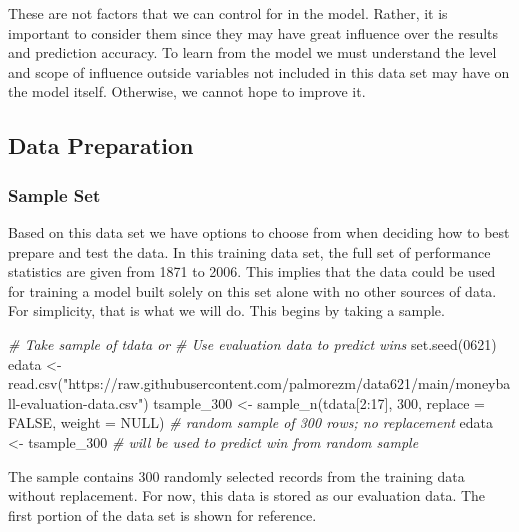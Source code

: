 \documentclass[
]{article}
\newenvironment{Shaded}{\begin{snugshade}}{\end{snugshade}}
\newcommand{\AttributeTok}[1]{\textcolor[rgb]{0.77,0.63,0.00}{#1}}
\newcommand{\CommentTok}[1]{\textcolor[rgb]{0.56,0.35,0.01}{\textit{#1}}}
\newcommand{\ConstantTok}[1]{\textcolor[rgb]{0.00,0.00,0.00}{#1}}
\newcommand{\DecValTok}[1]{\textcolor[rgb]{0.00,0.00,0.81}{#1}}
\newcommand{\FunctionTok}[1]{\textcolor[rgb]{0.00,0.00,0.00}{#1}}
\newcommand{\NormalTok}[1]{#1}
\newcommand{\OtherTok}[1]{\textcolor[rgb]{0.56,0.35,0.01}{#1}}
\newcommand{\SpecialCharTok}[1]{\textcolor[rgb]{0.00,0.00,0.00}{#1}}
\newcommand{\StringTok}[1]{\textcolor[rgb]{0.31,0.60,0.02}{#1}}
\begin{document}
These are not factors that we can control for in the model. Rather, it
is important to consider them since they may have great influence over
the results and prediction accuracy. To learn from the model we must
understand the level and scope of influence outside variables not
included in this data set may have on the model itself. Otherwise, we
cannot hope to improve it.

\hypertarget{data-preparation}{%
\subsection{Data Preparation}\label{data-preparation}}

\hypertarget{sample-set}{%
\subsubsection{Sample Set}\label{sample-set}}

Based on this data set we have options to choose from when deciding how
to best prepare and test the data. In this training data set, the full
set of performance statistics are given from 1871 to 2006. This implies
that the data could be used for training a model built solely on this
set alone with no other sources of data. For simplicity, that is what we
will do. This begins by taking a sample.

\begin{Shaded}
\begin{Highlighting}[]
\CommentTok{\# Take sample of tdata or }
\CommentTok{\# Use evaluation data to predict wins }
\FunctionTok{set.seed}\NormalTok{(}\DecValTok{0621}\NormalTok{)}
\NormalTok{edata }\OtherTok{\textless{}{-}} \FunctionTok{read.csv}\NormalTok{(}\StringTok{"https://raw.githubusercontent.com/palmorezm/data621/main/moneyball{-}evaluation{-}data.csv"}\NormalTok{)}
\NormalTok{tsample\_300 }\OtherTok{\textless{}{-}} \FunctionTok{sample\_n}\NormalTok{(tdata[}\DecValTok{2}\SpecialCharTok{:}\DecValTok{17}\NormalTok{], }\DecValTok{300}\NormalTok{, }\AttributeTok{replace =} \ConstantTok{FALSE}\NormalTok{, }\AttributeTok{weight =} \ConstantTok{NULL}\NormalTok{) }\CommentTok{\# random sample of 300 rows; no replacement}
\NormalTok{edata }\OtherTok{\textless{}{-}}\NormalTok{ tsample\_300 }\CommentTok{\# will be used to predict win from random sample}
\end{Highlighting}
\end{Shaded}

The sample contains 300 randomly selected records from the training data
without replacement. For now, this data is stored as our evaluation
data. The first portion of the data set is shown for reference.
\end{document}

